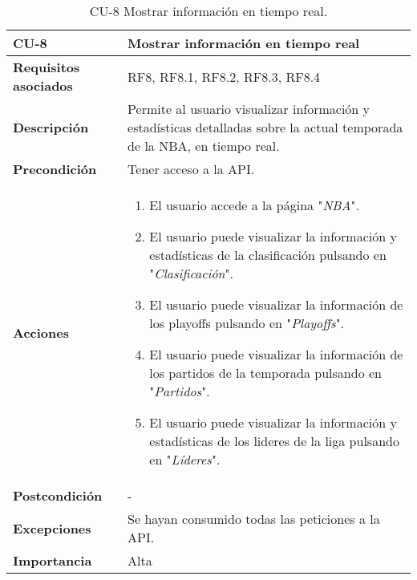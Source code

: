 \begin{table}[p]
	\centering
	\begin{tabularx}{\linewidth}{ p{} p{} }
		\toprule
		\textbf{CU-8}    & \textbf{Mostrar información en tiempo real}\\
		\toprule
		\textbf{Requisitos asociados} & RF8, RF8.1, RF8.2, RF8.3, RF8.4 \\
		\textbf{Descripción}          & Permite al usuario visualizar información y estadísticas detalladas sobre la actual temporada de la NBA, en tiempo real. \\
		\textbf{Precondición}         & Tener acceso a la API. \\
		\textbf{Acciones}             &
		\begin{enumerate}
			\def\labelenumi{\arabic{enumi}.}
			\tightlist
            \item El usuario accede a la página "\textit{NBA}".
			\item El usuario puede visualizar la información y estadísticas de la clasificación pulsando en "\textit{Clasificación}".
            \item El usuario puede visualizar la información de los playoffs pulsando en "\textit{Playoffs}".
            \item El usuario puede visualizar la información de los partidos de la temporada pulsando en "\textit{Partidos}".
            \item El usuario puede visualizar la información y estadísticas de los lideres de la liga pulsando en "\textit{Líderes}".
		\end{enumerate}\\
		\textbf{Postcondición}        &  - \\
		\textbf{Excepciones}          &  Se hayan consumido todas las peticiones a la API. \\
		\textbf{Importancia}          &  Alta \\
		\bottomrule
	\end{tabularx}
	\caption{CU-8 Mostrar información en tiempo real.}
\end{table}

